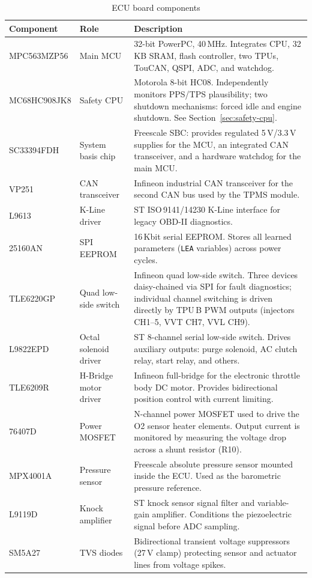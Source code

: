 \documentclass[a4paper,11pt]{article}
\renewcommand{\_}{\oldunderscore\allowbreak}
\begin{document}
\begin{table}[H]
\centering
\begin{tabular}{llp{8.5cm}}
\toprule
\textbf{Component} & \textbf{Role} & \textbf{Description} \\
\midrule
MPC563MZP56   & Main MCU        & 32-bit PowerPC, 40\,MHz. Integrates CPU, 32\,KB SRAM, flash controller, two TPUs, TouCAN, QSPI, ADC, and watchdog. \\
MC68HC908JK8  & Safety CPU      & Motorola 8-bit HC08. Independently monitors PPS/TPS plausibility; two shutdown mechanisms: forced idle and engine shutdown. See Section~\ref{sec:safety-cpu}. \\
SC33394FDH    & System basis chip & Freescale SBC: provides regulated 5\,V/3.3\,V supplies for the MCU, an integrated CAN transceiver, and a hardware watchdog for the main MCU. \\
VP251         & CAN transceiver & Infineon industrial CAN transceiver for the second CAN bus used by the TPMS module. \\
L9613         & K-Line driver   & ST ISO\,9141/14230 K-Line interface for legacy OBD-II diagnostics. \\
25160AN       & SPI EEPROM      & 16\,Kbit serial EEPROM. Stores all learned parameters (\texttt{LEA\_} variables) across power cycles. \\
TLE6220GP     & Quad low-side switch & Infineon quad low-side switch. Three devices daisy-chained via SPI for fault diagnostics; individual channel switching is driven directly by TPU\,B PWM outputs (injectors CH1--5, VVT CH7, VVL CH9). \\
L9822EPD      & Octal solenoid driver & ST 8-channel serial low-side switch. Drives auxiliary outputs: purge solenoid, AC clutch relay, start relay, and others. \\
TLE6209R      & H-Bridge motor driver & Infineon full-bridge for the electronic throttle body DC motor. Provides bidirectional position control with current limiting. \\
76407D        & Power MOSFET    & N-channel power MOSFET used to drive the O2 sensor heater elements. Output current is monitored by measuring the voltage drop across a shunt resistor (R10). \\
MPX4001A      & Pressure sensor & Freescale absolute pressure sensor mounted inside the ECU. Used as the barometric pressure reference. \\
L9119D        & Knock amplifier & ST knock sensor signal filter and variable-gain amplifier. Conditions the piezoelectric signal before ADC sampling. \\
SM5A27        & TVS diodes      & Bidirectional transient voltage suppressors (27\,V clamp) protecting sensor and actuator lines from voltage spikes. \\
\bottomrule
\end{tabular}
\caption{ECU board components}\label{tab:hw}
\end{table}
\end{document}
